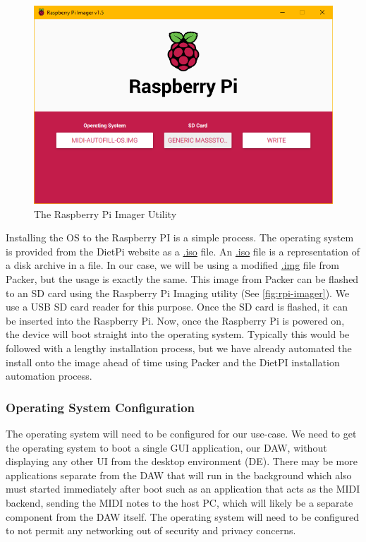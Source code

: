 \begin{figure}[h!]
  \centering
  \includegraphics[width=\linewidth]{image/rpi-imager.png}
  \caption{The Raspberry Pi Imager Utility}
  \label{fig:rpi-imager}
\end{figure}

Installing the OS to the Raspberry PI is a simple process. The operating system is
provided from the DietPi website as a \url{.iso} file. An \url{.iso} file is a
representation of a disk archive in a file. In our case, we will be using a modified
\url{.img} file from Packer, but the usage is exactly the same. This image from Packer can
be flashed to an SD card using the Raspberry Pi Imaging utility (See
\autoref{fig:rpi-imager}). We use a USB SD card reader for this purpose. Once the SD card
is flashed, it can be inserted into the Raspberry Pi. Now, once the Raspberry Pi is
powered on, the device will boot straight into the operating system. Typically this would
be followed with a lengthy installation process, but we have already automated the install
onto the image ahead of time using Packer and the DietPI installation automation process.

\subsubsection{Operating System Configuration}
\label{sec:research:subsec:os_config}

The operating system will need to be configured for our use-case. We need to get the
operating system to boot a single GUI application, our DAW, without displaying any other
UI from the desktop environment (DE). There may be more applications separate from the DAW
that will run in the background which also must started immediately after boot such as an
application that acts as the MIDI backend, sending the MIDI notes to the host PC, which
will likely be a separate component from the DAW itself. The operating system will need to
be configured to not permit any networking out of security and privacy concerns.

